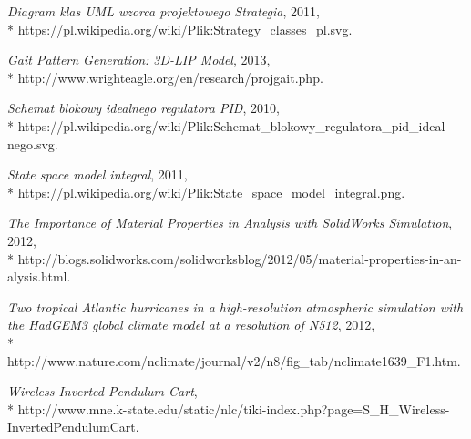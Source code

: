 \documentclass[12pt, oneside]{report}
\theoremstyle{definition}
\begin{document}
\begin{thebibliography}{11}
\emph{Diagram klas UML wzorca projektowego Strategia},
2011,
\\*
https://pl.wikipedia.org/wiki/Plik:Strategy\_classes\_pl.svg.

\emph{Gait Pattern Generation: 3D-LIP Model},
2013,
\\*
http://www.wrighteagle.org/en/research/projgait.php.

\emph{Schemat blokowy idealnego regulatora PID}, 
2010,
\\*
https://pl.wikipedia.org/wiki/Plik:Schemat\_blokowy\_regulatora\_pid\_ideal-\\nego.svg.

 \emph{State space model integral}, 2011,
\\*
https://pl.wikipedia.org/wiki/Plik:State\_space\_model\_integral.png.

\emph{The Importance of Material Properties in Analysis with SolidWorks Simulation}, 
2012,
\\*
http://blogs.solidworks.com/solidworksblog/2012/05/material-properties-in-an-\\alysis.html.

\emph{Two tropical Atlantic hurricanes in a high-resolution atmospheric simulation with the HadGEM3 global climate model at a resolution of N512}, 
2012,
\\*
http://www.nature.com/nclimate/journal/v2/n8/fig\_tab/nclimate1639\_F1.htm.

 \emph{Wireless Inverted Pendulum Cart},
\\*
http://www.mne.k-state.edu/static/nlc/tiki-index.php?page=S\_H\_Wireless-\\InvertedPendulumCart.

\end{thebibliography}
\end{document}
